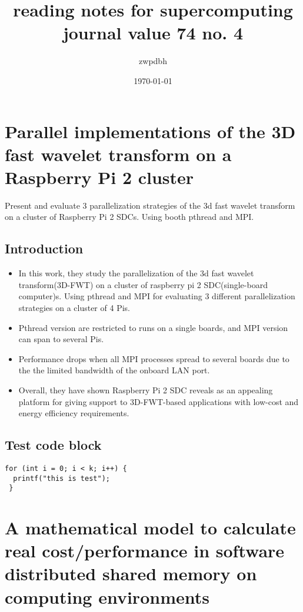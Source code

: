 \documentclass[11pt]{article}
\author{zwpdbh}
\date{\today}
\title{reading notes for supercomputing journal value 74 no. 4}
\begin{document}
\maketitle
\tableofcontents



\section{Parallel implementations of the 3D fast wavelet transform on a Raspberry Pi 2 cluster \cite{bernabe16_paral_implem_fast_wavel_trans}}
\label{sec-1}
Present and evaluate 3 parallelization strategies of the 3d fast wavelet transform on a cluster of Raspberry Pi 2 SDCs. Using booth pthread and MPI.

\subsection{Introduction}
\label{sec-1-1}
\begin{itemize}
\item In this work, they study the parallelization of the 3d fast wavelet transform(3D-FWT) on a cluster of raspberry pi 2 SDC(single-board computer)s. Using pthread and MPI for evaluating 3 different parallelization strategies on a cluster of 4 Pis.
\item Pthread version are restricted to runs on a single boards, and MPI version can span to several Pis.
\item Performance drops when all MPI processes spread to several boards due to the the limited bandwidth of the onboard LAN port.
\item Overall, they have shown Raspberry Pi 2 SDC reveals as an appealing platform for giving support to 3D-FWT-based applications with low-cost and energy efficiency requirements.
\end{itemize}

\subsection{Test code block}
\label{sec-1-2}
\begin{verbatim}
for (int i = 0; i < k; i++) {
  printf("this is test");
 }
\end{verbatim}

\section{A mathematical model to calculate real cost/performance in software distributed shared memory on computing environments \cite{khaneghah17_mathem_model_to_calcul_real}}
\label{sec-2}
\end{document}
